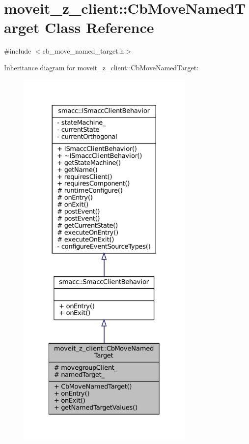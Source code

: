 \hypertarget{classmoveit__z__client_1_1CbMoveNamedTarget}{}\section{moveit\+\_\+z\+\_\+client\+:\+:Cb\+Move\+Named\+Target Class Reference}
\label{classmoveit__z__client_1_1CbMoveNamedTarget}


{\ttfamily \#include $<$cb\+\_\+move\+\_\+named\+\_\+target.\+h$>$}



Inheritance diagram for moveit\+\_\+z\+\_\+client\+:\+:Cb\+Move\+Named\+Target\+:
\nopagebreak
\begin{figure}[H]
\begin{center}
\leavevmode
\includegraphics[height=550pt]{classmoveit__z__client_1_1CbMoveNamedTarget__inherit__graph}
\end{center}
\end{figure}


